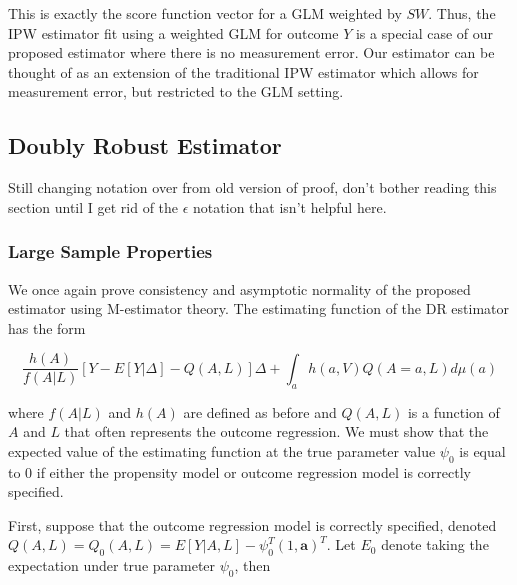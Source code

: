 \documentclass[12pt]{article}
\begin{document}
This is exactly the score function vector for a GLM weighted by $SW$. Thus, the IPW estimator fit using a weighted GLM for outcome $Y$ is a special case of our proposed estimator where there is no measurement error. Our estimator can be thought of as an extension of the traditional IPW estimator which allows for measurement error, but restricted to the GLM setting.

\subsection{Doubly Robust Estimator}

Still changing notation over from old version of proof, don't bother reading this section until I get rid of the $\epsilon$ notation that isn't helpful here.

\subsubsection{Large Sample Properties}

We once again prove consistency and asymptotic normality of the proposed estimator using M-estimator theory. The estimating function of the DR estimator has the form

\begin{equation}
\frac{h(A)}{f(A | L)}[Y - E[Y | \Delta] - Q(A, L)]\Delta + \int_{a} h(a, V)Q(A = a, L)d\mu (a)
\end{equation}

where $f(A|L)$ and $h(A)$ are defined as before and $Q(A, L)$ is a function of $A$ and $L$ that often represents the outcome regression. We must show that the expected value of the estimating function at the true parameter value $\psi_{0}$ is equal to 0 if either the propensity model or outcome regression model is correctly specified.

First, suppose that the outcome regression model is correctly specified, denoted $Q(A, L) = Q_{0}(A, L) = E[Y | A, L] - \psi_{0}^{T}(1, \bm{a})^{T}$. Let $E_{0}$ denote taking the expectation under true parameter $\psi_{0}$, then
\end{document}
